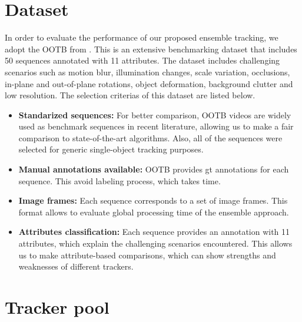 \section{Dataset}
In order to evaluate the performance of our proposed ensemble tracking,
we adopt the OOTB from \cite{Wu2013B}.
This is an extensive benchmarking dataset that includes 50 sequences
annotated with 11 attributes.
The dataset includes challenging scenarios such as motion blur,
illumination changes, scale variation, occlusions,
in-plane and out-of-plane rotations, object deformation,
background clutter and low resolution. The selection criterias of this dataset
are listed below. 
\begin{itemize}
\item \textbf{Standarized sequences: }For better comparison, OOTB videos are
widely used as benchmark sequences in recent literature, allowing us to make a
fair comparison to state-of-the-art algorithms. Also, all of the sequences were
selected for generic single-object tracking purposes.
\item \textbf{Manual annotations available: }OOTB provides \gls{gt} annotations for
each sequence. This avoid labeling process, which takes time.
\item \textbf{Image frames: } Each sequence corresponds to a set of image frames. This
format allows to evaluate global processing time of the ensemble approach.
\item \textbf{Attributes classification: } Each sequence provides an annotation with 11
attributes, which explain the challenging scenarios encountered. This
allows us to make attribute-based comparisons, which can show strengths and weaknesses of different trackers.

\end{itemize}

\section{Tracker pool}

